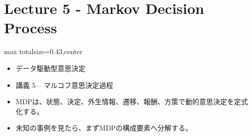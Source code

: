 \section*{Lecture 5 - Markov Decision Process}

\clearpage
{}
\begin{minipage}[t]{0.405\textwidth}
\begin{adjustbox}{max totalsize={\textwidth}{0.43\textheight},center}
\begin{minipage}{\textwidth}\scriptsize
{}\begin{itemize}
\item データ駆動型意思決定
\item 講義 5 – マルコフ意思決定過程
\end{itemize}\begin{itemize}
\item MDPは、状態、決定、外生情報、遷移、報酬、方策で動的意思決定を定式化する。
\item 未知の事例を見たら、まずMDPの構成要素へ分解する。
\end{itemize}
\end{minipage}
\end{adjustbox}
\end{minipage}\hfill
